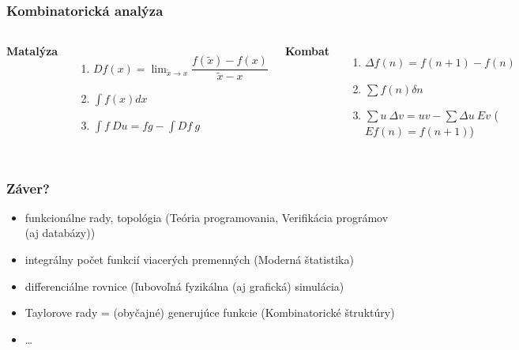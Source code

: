 \documentclass{beamer}
\begin{document}
\begin{frame}
\frametitle{Kombinatorická analýza}
\begin{columns}[c] %

\textbf{Matalýza}
\begin{enumerate}
\item<1-> $ D f(x) = \lim_{\tilde{x} \to x} \dfrac{f(\tilde{x}) - f(x)}{\tilde{x} - x}$
\item<2-> $\int f(x) dx$
\item<3-> $\int f~Du = fg - \int Df ~g $
\end{enumerate}

\textbf{Kombat}
\begin{enumerate}
\item<1-> $ \Delta f (n) = f(n+1) - f(n)$
\item<2-> $\sum f(n) \delta n$
\item<3-> $\sum u ~ \Delta v = u v - \sum \Delta u ~ Ev$ ($E f(n) = f(n+1)$)
\end{enumerate}
\end{columns}
\end{frame}

\begin{frame}
\frametitle{Záver?}
\begin{itemize}
  \item funkcionálne rady, topológia (Teória programovania, Verifikácia prográmov (aj databázy))
  \item integrálny počet funkcií viacerých premenných (Moderná štatistika)
  \item differenciálne rovnice (ľubovoľná fyzikálna (aj grafická) simulácia)
  \item Taylorove rady = (obyčajné) generujúce funkcie (Kombinatorické štruktúry)
  \item \ldots
\end{itemize}
\end{frame}

% 
\end{document}
